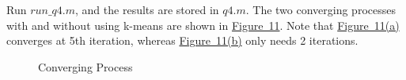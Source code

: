 \documentclass{article}
\begin{document}
Run $run\_q4.m$, and the results are stored in $q4.m$. The two converging processes with and without using k-means are shown in \hyperref[fig-11]{Figure~11}. Note that \hyperref[subfig-11(a)]{Figure~11(a)} converges at 5th iteration, whereas \hyperref[subfig-11(b)]{Figure~11(b)} only needs 2 iterations.

\begin{figure}
	\centering
	\quad
	\caption{Converging Process}
	\label{fig-11}
\end{figure}
\end{document}
